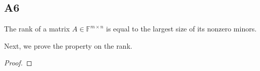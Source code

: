 \documentclass[11pt]{article}
\newcommand{\field}{\mathbb{F}} %
\begin{document}
\subsection*{A6}
The rank of a matrix \(A \in \field^{m \times n}\) is equal to the largest size of its nonzero minors.

Next, we prove the property on the rank.
\begin{proof}
\end{proof}

\end{document}
